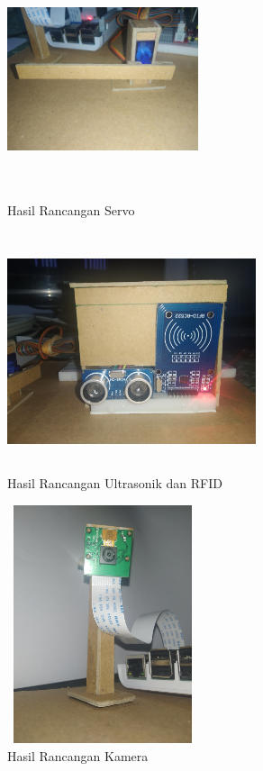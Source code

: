 \begin{figure} [H]
    \includegraphics[height=7cm, width=0.5\textwidth, center]{images/alat-servo.jpg}
    \caption{Hasil Rancangan Servo}
    \label{fig:alatservo}
\end{figure}

\begin{figure} [H]
    \includegraphics[height=7cm, width=0.65\textwidth, center]{images/alat-ultra&rfid.jpg}
    \caption{Hasil Rancangan Ultrasonik dan RFID}
    \label{fig:alatultrarfid}
\end{figure}

\begin{figure} [H]
    \includegraphics[height=7cm, width=0.5\textwidth, center]{images/alat-kamera.jpg}
    \caption{Hasil Rancangan Kamera}
    \label{fig:alatkamera}
\end{figure}

